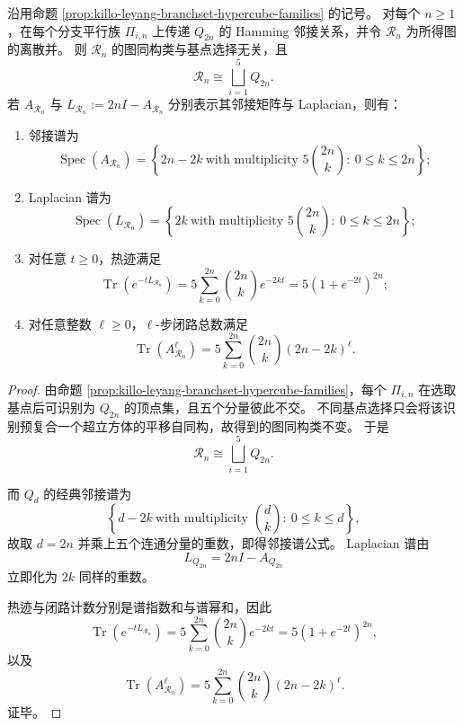 \begin{theorem}\label{thm:killo-leyang-branch-graph-full-spectrum}
沿用命题 \ref{prop:killo-leyang-branchset-hypercube-families} 的记号。
对每个 \(n\ge 1\)，在每个分支平行族 \(\Pi_{i,n}\) 上传递 \(Q_{2n}\) 的 Hamming 邻接关系，并令 \(\mathcal R_n\) 为所得图的离散并。
则 \(\mathcal R_n\) 的图同构类与基点选择无关，且
\[
\mathcal R_n\cong \bigsqcup_{i=1}^{5}Q_{2n}.
\]
若 \(A_{\mathcal R_n}\) 与 \(L_{\mathcal R_n}:=2nI-A_{\mathcal R_n}\) 分别表示其邻接矩阵与 Laplacian，则有：
\begin{enumerate}
  \item 邻接谱为
  \[
  \operatorname{Spec}(A_{\mathcal R_n})
  =
  \left\{
  2n-2k\ \text{with multiplicity }5\binom{2n}{k}
  :\ 0\le k\le 2n
  \right\};
  \]
  \item Laplacian 谱为
  \[
  \operatorname{Spec}(L_{\mathcal R_n})
  =
  \left\{
  2k\ \text{with multiplicity }5\binom{2n}{k}
  :\ 0\le k\le 2n
  \right\};
  \]
  \item 对任意 \(t\ge 0\)，热迹满足
  \[
  \operatorname{Tr}(e^{-tL_{\mathcal R_n}})
  =
  5\sum_{k=0}^{2n}\binom{2n}{k}e^{-2kt}
  =
  5(1+e^{-2t})^{2n};
  \]
  \item 对任意整数 \(\ell\ge 0\)，\(\ell\)-步闭路总数满足
  \[
  \operatorname{Tr}(A_{\mathcal R_n}^{\ell})
  =
  5\sum_{k=0}^{2n}\binom{2n}{k}(2n-2k)^\ell.
  \]
\end{enumerate}
\end{theorem}
\begin{proof}
由命题 \ref{prop:killo-leyang-branchset-hypercube-families}，每个 \(\Pi_{i,n}\) 在选取基点后可识别为 \(Q_{2n}\) 的顶点集，且五个分量彼此不交。
不同基点选择只会将该识别预复合一个超立方体的平移自同构，故得到的图同构类不变。
于是
\[
\mathcal R_n\cong \bigsqcup_{i=1}^{5}Q_{2n}.
\]

而 \(Q_d\) 的经典邻接谱为
\[
\left\{
d-2k\ \text{with multiplicity }\binom{d}{k}
:\ 0\le k\le d
\right\},
\]
故取 \(d=2n\) 并乘上五个连通分量的重数，即得邻接谱公式。
Laplacian 谱由
\[
L_{Q_{2n}}=2nI-A_{Q_{2n}}
\]
立即化为 \(2k\) 同样的重数。

热迹与闭路计数分别是谱指数和与谱幂和，因此
\[
\operatorname{Tr}(e^{-tL_{\mathcal R_n}})
=
5\sum_{k=0}^{2n}\binom{2n}{k}e^{-2kt}
=
5(1+e^{-2t})^{2n},
\]
以及
\[
\operatorname{Tr}(A_{\mathcal R_n}^{\ell})
=
5\sum_{k=0}^{2n}\binom{2n}{k}(2n-2k)^\ell.
\]
证毕。
\end{proof}


